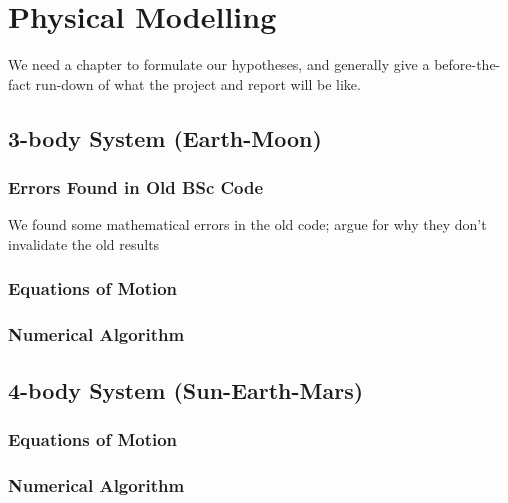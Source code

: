 
\chapter{Physical Modelling}
We need a chapter to formulate our hypotheses, and generally give a before-the-fact run-down of what the project and report will be like.

\section{3-body System (Earth-Moon)}
\subsection{Errors Found in Old BSc Code}
We found some mathematical errors in the old code; argue for why they don’t invalidate the old results

\subsection{Equations of Motion}

\subsection{Numerical Algorithm}

\section{4-body System (Sun-Earth-Mars)}

\subsection{Equations of Motion}

\subsection{Numerical Algorithm}
